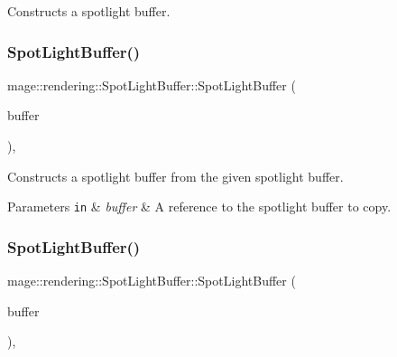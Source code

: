 Constructs a spotlight buffer. \mbox{\label{structmage_1_1rendering_1_1_spot_light_buffer_a091924b026f081f1612138806ff1e107}} 
\subsubsection{\texorpdfstring{Spot\+Light\+Buffer()}{SpotLightBuffer()}\hspace{0.1cm}{\footnotesize\ttfamily [2/3]}}
{\footnotesize\ttfamily mage\+::rendering\+::\+Spot\+Light\+Buffer\+::\+Spot\+Light\+Buffer (\begin{DoxyParamCaption}\item[{const \mbox{\hyperlink{structmage_1_1rendering_1_1_spot_light_buffer}{Spot\+Light\+Buffer}} \&}]{buffer }\end{DoxyParamCaption})\hspace{0.3cm}{\ttfamily [default]}, {\ttfamily [noexcept]}}

Constructs a spotlight buffer from the given spotlight buffer.


\begin{DoxyParams}[1]{Parameters}
\mbox{\tt in}  & {\em buffer} & A reference to the spotlight buffer to copy. \\
\hline
\end{DoxyParams}
\mbox{\label{structmage_1_1rendering_1_1_spot_light_buffer_a36fe774118a2b1d0e48ba89e74d09886}} 
\subsubsection{\texorpdfstring{Spot\+Light\+Buffer()}{SpotLightBuffer()}\hspace{0.1cm}{\footnotesize\ttfamily [3/3]}}
{\footnotesize\ttfamily mage\+::rendering\+::\+Spot\+Light\+Buffer\+::\+Spot\+Light\+Buffer (\begin{DoxyParamCaption}\item[{\mbox{\hyperlink{structmage_1_1rendering_1_1_spot_light_buffer}{Spot\+Light\+Buffer}} \&\&}]{buffer }\end{DoxyParamCaption})\hspace{0.3cm}{\ttfamily [default]}, {\ttfamily [noexcept]}}

